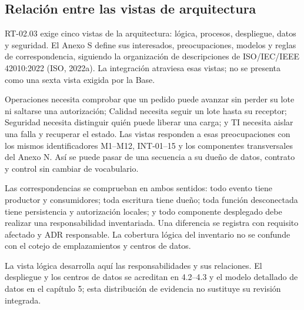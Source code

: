 \subsection{Relación entre las vistas de arquitectura}
\label{sec:iso42010}

RT-02.03 exige cinco vistas de la arquitectura: lógica, procesos, despliegue, datos y seguridad. El Anexo S define sus interesados, preocupaciones, modelos y reglas de correspondencia, siguiendo la organización de descripciones de ISO/IEC/IEEE 42010:2022 (ISO, 2022a). La integración atraviesa esas vistas; no se presenta como una sexta vista exigida por la Base.

Operaciones necesita comprobar que un pedido puede avanzar sin perder su lote ni saltarse una autorización; Calidad necesita seguir un lote hasta su receptor; Seguridad necesita distinguir quién puede liberar una carga; y TI necesita aislar una falla y recuperar el estado. Las vistas responden a esas preocupaciones con los mismos identificadores M1--M12, INT-01--15 y los componentes transversales del Anexo N. Así se puede pasar de una secuencia a su dueño de datos, contrato y control sin cambiar de vocabulario.

Las correspondencias se comprueban en ambos sentidos: todo evento tiene productor y consumidores; toda escritura tiene dueño; toda función desconectada tiene persistencia y autorización locales; y todo componente desplegado debe realizar una responsabilidad inventariada. Una diferencia se registra con requisito afectado y ADR responsable. La cobertura lógica del inventario no se confunde con el cotejo de emplazamientos y centros de datos.

La vista lógica desarrolla aquí las responsabilidades y sus relaciones. El despliegue y los centros de datos se acreditan en 4.2--4.3 y el modelo detallado de datos en el capítulo 5; esta distribución de evidencia no sustituye su revisión integrada.



